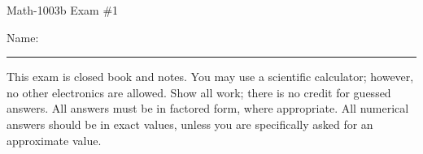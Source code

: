 \documentclass[letterpaper,12pt,fleqn]{article}
\begin{document}
\begin{center}
\Large Math-1003b Exam \#1
\end{center}

\vspace{0.5in}

Name: \rule{4in}{1pt}

\vspace{0.5in}

This exam is closed book and notes. You may use a scientific calculator;
however, no other electronics are allowed. Show all work; there is no credit
for guessed answers. All answers must be in factored form, where appropriate.
All numerical answers should be in exact values, unless you are specifically
asked for an approximate value.

\vspace{0.5in}
\end{document}

